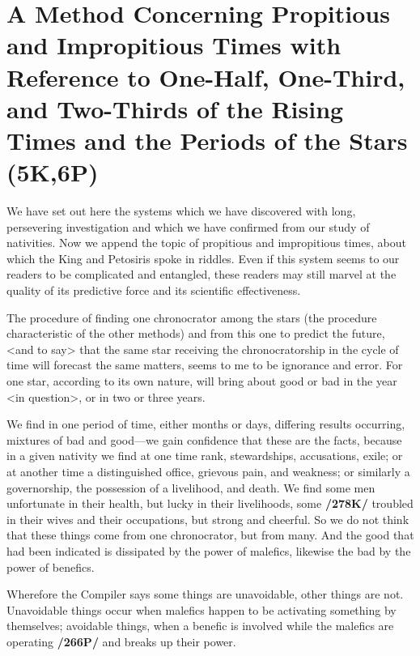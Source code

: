 \section{A Method Concerning Propitious and Impropitious Times with Reference to One-Half, One-Third, and Two-Thirds of the Rising Times and the Periods of the Stars (5K,6P)}

We have set out here the systems which we have discovered with long, persevering investigation and which we have confirmed from our study of nativities. Now we append the topic of propitious and
impropitious times, about which the King and Petosiris spoke in riddles. Even if this system seems to our readers to be complicated and entangled, these readers may still marvel at the quality of its predictive force and its scientific effectiveness. 

The procedure of finding one chronocrator among the stars (the procedure characteristic of the other methods) and from this one to predict the future, <and to say> that the same star receiving the chronocratorship in the cycle of time will forecast the same matters, seems to me to be ignorance and error. For one star, according to its own nature, will bring about good or bad in the year <in question>, or in two or three years. 

We find in one period of time, either months or days, differing results occurring, mixtures of bad and good—we gain confidence that these are the facts, because in a given nativity we find at one time rank, stewardships, accusations, exile; or at another time a distinguished office, grievous pain, and weakness; or similarly a governorship, the possession of a livelihood, and death. We find some men unfortunate in their health, but lucky in their livelihoods, some \textbf{/278K/} troubled in their wives and their occupations, but strong and cheerful. So we do not think that these things come from one chronocrator, but from many. And the good that had been indicated is dissipated by the power of malefics, likewise the bad by the power of benefics.

Wherefore the Compiler says some things are unavoidable, other things are not. Unavoidable things occur when malefics happen to be activating something by themselves; avoidable things, when a benefic is involved while the malefics are operating \textbf{/266P/} and breaks up their power. 

